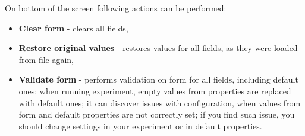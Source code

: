 On bottom of the screen following actions can be performed:
\begin{itemize}
	\item \textbf{Clear form} - clears all fields,
	\item \textbf{Restore original values} - restores values for all fields, as they were loaded from file again,
	\item \textbf{Validate form} - performs validation on form for all fields, including default ones; when running experiment, empty values from properties are replaced with default ones; it can discover issues with configuration, when values from form and default properties are not correctly set; if you find such issue, you should change settings in your experiment or in default properties.
\end{itemize}

